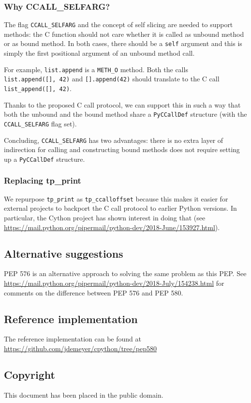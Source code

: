 \subsubsection{Why CCALL\_SELFARG?}

The flag \texttt{CCALL\_SELFARG} and the concept of self slicing are
needed to support methods: the C function should not care whether it is
called as unbound method or as bound method. In both cases, there should
be a \texttt{self} argument and this is simply the first positional
argument of an unbound method call.

For example, \texttt{list.append} is a \texttt{METH\_O} method. Both the
calls \texttt{list.append({[}{]},\ 42)} and \texttt{{[}{]}.append(42)}
should translate to the C call \texttt{list\_append({[}{]},\ 42)}.

Thanks to the proposed C call protocol, we can support this in such a
way that both the unbound and the bound method share a
\texttt{PyCCallDef} structure (with the \texttt{CCALL\_SELFARG} flag
set).

Concluding, \texttt{CCALL\_SELFARG} has two advantages: there is no
extra layer of indirection for calling and constructing bound methods
does not require setting up a \texttt{PyCCallDef} structure.

\subsubsection{Replacing tp\_print}

We repurpose \texttt{tp\_print} as \texttt{tp\_ccalloffset} because this
makes it easier for external projects to backport the C call protocol to
earlier Python versions. In particular, the Cython project has shown
interest in doing that (see
\url{https://mail.python.org/pipermail/python-dev/2018-June/153927.html}).

\subsection{Alternative suggestions}

PEP 576 is an alternative approach to solving the same problem as this
PEP. See
\url{https://mail.python.org/pipermail/python-dev/2018-July/154238.html}
for comments on the difference between PEP 576 and PEP 580.

\subsection{Reference implementation}

The reference implementation can be found at
\url{https://github.com/jdemeyer/cpython/tree/pep580}

\subsection{Copyright}

This document has been placed in the public domain.
